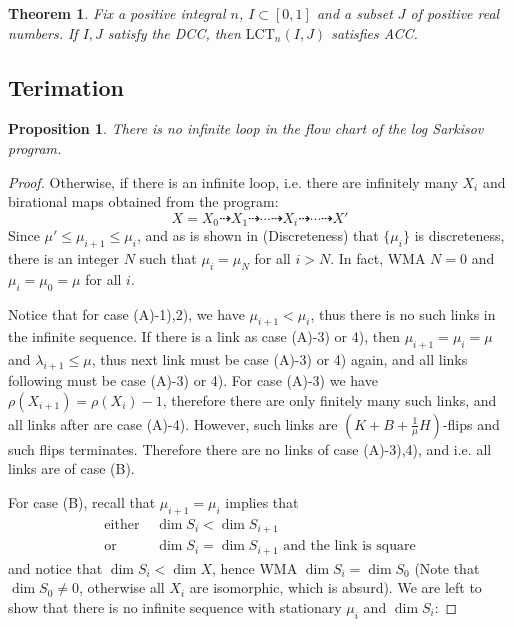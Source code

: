 \documentclass{article}
\newtheorem{prop}[defn]{Proposition}
\newtheorem{thm}[defn]{Theorem}
\begin{document}
\begin{thm}
  Fix a positive integral $ n $, $ I\subset [0,1] $ and a subset $ J $ of positive real numbers. If $ I,J $ satisfy the DCC, then $ \mathrm{LCT}_n(I,J) $ satisfies ACC.
\end{thm}

\subsection{Terimation}
\begin{prop}
  There is no infinite loop in the flow chart of the log Sarkisov program.
\end{prop}
\begin{proof}
  Otherwise, if there is an infinite loop, i.e. there are infinitely many $ X_i $ and birational maps obtained from the program:
  $$ X=X_0\dashrightarrow X_1\dashrightarrow \cdots\dashrightarrow X_i \dashrightarrow\cdots\dashrightarrow X'$$
  Since $ \mu'\leqslant\mu_{i+1}\leqslant \mu_i $, and as is shown in (Discreteness) that $ \{\mu_i\} $ is discreteness, there is an integer $ N $ such that $ \mu_i=\mu_N $ for all $ i>N $. In fact, WMA $ N=0 $ and $ \mu_i=\mu_0=\mu $ for all $ i $. 
  
  Notice that for case (A)-1),2), we have $ \mu_{i+1}<\mu_i $, thus there is no such links in the infinite sequence. If there is a link as case (A)-3) or 4), then $ \mu_{i+1}=\mu_i=\mu  $ and $ \lambda_{i+1}\leqslant \mu $, thus next link must be case (A)-3) or 4) again, and all links following must be case (A)-3) or 4). For case (A)-3) we have $ \rho(X_{i+1})=\rho(X_i)-1 $, therefore there are only finitely many such links, and all links after are  case (A)-4). However, such links are $ (K+B+\frac{1}{\mu}H) $-flips and such flips terminates. Therefore there are no links of case (A)-3),4), and i.e. all links are of case (B).
  
  For case (B), recall that $ \mu_{i+1}=\mu_i $ implies that 
  \begin{equation*}
    \begin{aligned}
      \text{either } &\dim S_i<\dim S_{i+1} \\
      \text{or }&\dim S_i=\dim S_{i+1} \text{ and the link is square} 
    \end{aligned}
  \end{equation*} 
  and notice that $ \dim S_i< \dim X $, hence WMA $ \dim S_i=\dim S_0 $ (Note that $ \dim S_0 \neq 0$, otherwise all $ X_i $ are isomorphic, which is absurd). We are left to show that there is no infinite sequence with stationary $ \mu_i $ and $ \dim S_i $:
  

\end{proof}
\end{document}
